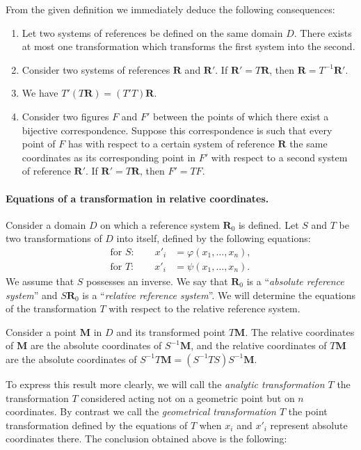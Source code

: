 \documentclass[leqno,11pt]{book}
\makeatletter
\numberwithin{equation}{chapter}
\theoremstyle{shape1}
\theoremstyle{shapesmall}
\let\old@phi\phi
\let\old@varphi\varphi
\let\phi\old@varphi
\let\varphi\old@phi
\makeatother
\begin{document}
From the given definition we immediately deduce the following consequences:
\begin{enumerate}[\itshape a.]
\item Let two systems of references be defined on the same domain $D$. There exists at most one transformation which transforms the first system into the second.
\item Consider two systems of references $\mathbf{R}$ and $\mathbf{R}'$. If $\mathbf{R}'=T\mathbf{R}$, then $\mathbf{R}=T^{-1}\mathbf{R}'$.
\item We have $T'(T\mathbf{R})=(T'T)\mathbf{R}$.
\item Consider two figures $F$ and $F'$ between the points of which there exist a bijective correspondence. Suppose this correspondence is such that every point of $F$ has with respect to a certain system of reference $\mathbf{R}$ the same coordinates as its corresponding point in $F'$ with respect to a second system of reference $\mathbf{R}'$. If $\mathbf{R}'=T\mathbf{R}$, then $F'=TF$.
\end{enumerate}

\paragraph{Equations of a transformation in relative coordinates.}
\label{sec:62}
Consider a domain $D$ on which a reference system $\mathbf{R}_{0}$ is defined. Let $S$ and $T$ be two transformations of $D$ into itself, defined by the following equations:
\begin{align*}
  \text{for }S:\qquad x'_{i}&=\phi(x_{1},\dots,x_{n}),\\
  \text{for }T:\qquad x'_{i}&=\psi(x_{1},\dots,x_{n}).
\end{align*}
We assume that $S$ possesses an inverse. We say that $\mathbf{R}_{0}$ is a ``\emph{absolute reference system}'' and $S\mathbf{R}_{0}$ is a ``\emph{relative reference system}''. We will determine the equations of the transformation $T$ with respect to the relative reference system.

Consider a point $\mathbf{M}$ in $D$ and its transformed point $T\mathbf{M}$. The relative coordinates of $\mathbf{M}$ are the absolute coordinates of $S^{-1}\mathbf{M}$, and the relative coordinates of $T\mathbf{M}$ are the absolute coordinates of $S^{-1}T\mathbf{M}=(S^{-1}TS)S^{-1}\mathbf{M}$.

To express this result more clearly, we will call the \emph{analytic transformation $T$} the transformation $T$ considered acting not on a geometric point but on $n$ coordinates. By contrast we call the \emph{geometrical transformation $T$} the point transformation defined by the equations of $T$ when $x_{i}$ and $x'_{i}$ represent absolute coordinates there. The conclusion obtained above is the following:
\end{document}
